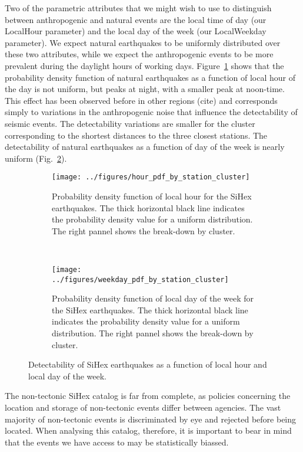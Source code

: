 Two of the parametric attributes that we might wish to use to distinguish
between anthropogenic and natural events are the local time of day (our
LocalHour parameter) and the local day of the week (our LocalWeekday
parameter). We expect natural earthquakes to be uniformly distributed over
these two attributes, while we expect the anthropogenic events to be more
prevalent during the daylight hours of working days.
Figure~\ref{fg:detectability_hour} shows that the probability density function
of natural earthquakes as a function of local hour of the day is not uniform,
but peaks at night, with a smaller peak at noon-time.  This effect has been
observed before in other regions (cite) and corresponds simply to variations in
the anthropogenic noise that influence the detectability of seismic events. The
detectability variations are smaller for the cluster corresponding to the
shortest distances to the three closest stations. The detectability of natural
earthquakes as a function of day of the week is nearly uniform
(Fig.~\ref{fg:detectability_day}).

\begin{figure}
\centering
\begin{subfigure}[t]{\textwidth}
	\centering
	\texttt{[image: ../figures/hour\_pdf\_by\_station\_cluster]}
	\caption{Probability density function of local hour for the SiHex
	earthquakes. The thick horizontal black line indicates the probability
	density value for a uniform distribution.  The right pannel shows the
	break-down by cluster. 
	} 
	\label{fg:detectability_hour}
\end{subfigure}
~
\begin{subfigure}[t]{\textwidth}
	\centering
	\texttt{[image: ../figures/weekday\_pdf\_by\_station\_cluster]}
	\caption{Probability density function of local day of the week for the
	SiHex earthquakes.  The thick horizontal black line indicates the
	probability density value for a uniform distribution.  The right pannel
	shows the break-down by cluster.
	} 
	\label{fg:detectability_day}
\end{subfigure}
\caption{Detectability of SiHex earthquakes as a function of local hour and
local day of the week.}
\label{fg:detectability}
\end{figure}

The non-tectonic SiHex catalog is far from complete, as policies concerning the
location and storage of non-tectonic events differ between agencies. The vast
majority of non-tectonic events is discriminated by eye and rejected before
being located. When analysing this catalog, therefore, it is important to bear
in mind that the events we have access to may be statistically biassed.

